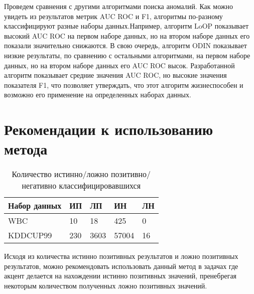 Проведем сравнения с другими алгоритмами поиска аномалий.
Как можно увидеть из результатов  метрик AUC ROC и F1, алгоритмы по-разному классифицируют  разные наборы данных.Например, алгоритм LoOP показывает высокий AUC ROC на первом наборе данных, но на втором наборе данных его показали значительно снижаются. В свою очередь, алгоритм ODIN показывает низкие результаты, по сравнению с остальными алгоритмами, на первом наборе данных, но на втором наборе данных его AUC ROC высок. Разработанной алгоритм показывает средние значения AUC ROC, но высокие значения показателя F1, что позволяет утверждать, что этот алгоритм жизнеспособен и возможно его применение на определенных наборах данных. 
\section{Рекомендации к использованию метода}
\begin{table}[h]
	
	\caption{\label{tab:issled2}Количество истинно/ложно позитивно/негативно классифицировавшихся}
	
	\begin{center}
		
		\begin{tabular}{|l|l|l|l|l|}
			
			\hline
			
			Набор данных & ИП & ЛП &  ИН & ЛН \\
			
			\hline 
			
			WBC & 10 & 18 & 425 & 0  \\
			\hline 
				
			KDDCUP99& 230 & 3603 & 57004& 16  \\	 
			
			\hline  
			
		\end{tabular}
		
	\end{center}
	
\end{table}
Исходя из количества истинно позитивных результатов и ложно позитивных результатов, можно рекомендовать использовать данный метод в задачах где акцент делается на нахождении истинно позитивных значений, пренебрегая некоторым количеством полученных ложно позитивных значений.
